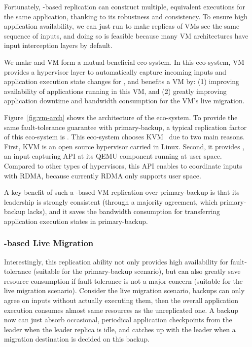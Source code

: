 Fortunately, \paxos-based replication can construct multiple, equivalent 
executions for the same application, thanking to its robustness and 
consistency. To ensure high application availability, we can just run \paxos to 
make replicas of VMs see the same sequence of inputs, and doing so is feasible 
because many VM architectures have input interception layers by default.

We make \falcon and VM form a mutual-beneficial eco-system. In this eco-system, 
VM provides a hypervisor layer to automatically capture incoming inputs and 
application execution state changes for \falcon, and \falcon benefits a VM by: 
(1) improving availability of applications running in this VM, and (2) greatly 
improving application downtime and bandwidth consumption for the VM's live 
migration.

Figure~\ref{fig:vm-arch} shows the architecture of the eco-system. To provide 
the same fault-tolerance guarantee with primary-backup, a typical replication 
factor of this eco-system is . This eco-system chooses KVM~\cite{kvm} 
due to two main reasons. First, KVM is an open source hypervisor carried in 
Linux. Second, it provides , an input capturing API at its QEMU 
component running at user space. Compared to other types of hypervisors, this 
API enables \falcon to coordinate inputs with RDMA, because currently RDMA only 
supports user space.

A key benefit of such a \paxos-based VM replication over primary-backup is that 
its leadership is strongly consistent (through a majority agreement, which 
primary-backup lacks), and it saves the bandwidth consumption for transferring 
application execution states in primary-backup.


\vspace{-.15in}\subsubsection{\paxos-based Live Migration} 
\label{sec:vm-migration}\vspace{-.075in}

Interestingly, this replication ability not only provides high 
availability for fault-tolerance (suitable for the primary-backup scenario), 
but can also greatly save resource consumption if fault-tolerance is not a 
major concern (suitable for the live migration scenario). Consider the live 
migration scenario, \paxos backups can only agree on inputs without actually 
executing them, then the overall application execution consumes almost same 
resources as the unreplicated one. A backup now can just absorb occasional, 
periodical application checkpoints from the leader when the leader replica is 
idle, and catches up with the leader when a migration destination is decided on 
this backup.

